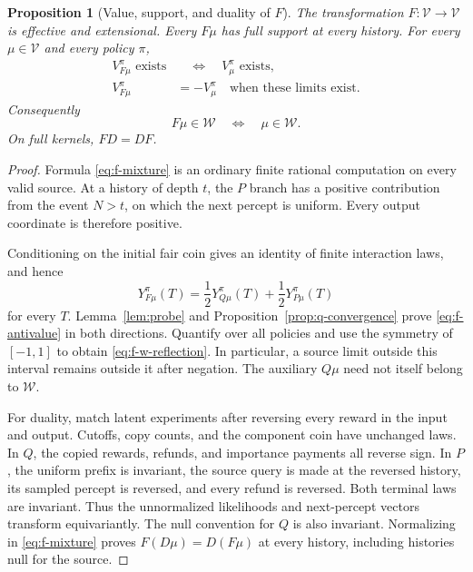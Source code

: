 \documentclass[11pt]{article}
\newtheorem{proposition}[theorem]{Proposition}
\theoremstyle{definition}
\theoremstyle{remark}
\newcommand{\V}{\mathcal V}
\newcommand{\W}{\mathcal W}
\begin{document}
\begin{proposition}[Value, support, and duality of $F$]
\label{prop:f-basic}
The transformation $F:\V\to\V$ is effective and extensional.  Every
$F\mu$ has full support at every history.  For every $\mu\in\V$ and
every policy $\pi$,
\begin{equation}
 \begin{split}
  V_{F\mu}^{\pi}\text{ exists}
      &\quad\Longleftrightarrow\quad V_\mu^\pi\text{ exists},\\
  V_{F\mu}^{\pi}&=-V_\mu^\pi
       \quad\text{when these limits exist}.
 \end{split}
 \label{eq:f-antivalue}
\end{equation}
Consequently
\begin{equation}
  F\mu\in\W\quad\Longleftrightarrow\quad\mu\in\W.
  \label{eq:f-w-reflection}
\end{equation}
On full kernels, $FD=DF$.
\end{proposition}

\begin{proof}
Formula \eqref{eq:f-mixture} is an ordinary finite rational computation
on every valid source.  At a history of depth $t$, the $P$ branch has
a positive contribution from the event $N>t$, on which the next
percept is uniform.  Every output coordinate is therefore positive.

Conditioning on the initial fair coin gives an identity of finite
interaction laws, and hence
\begin{equation}
  Y_{F\mu}^{\pi}(T)=
      \frac12Y_{Q\mu}^{\pi}(T)+\frac12Y_{P\mu}^{\pi}(T)
  \label{eq:f-finite-mixture}
\end{equation}
for every $T$.  Lemma~\ref{lem:probe} and
Proposition~\ref{prop:q-convergence} prove
\eqref{eq:f-antivalue} in both directions.  Quantify over all policies
and use the symmetry of $[-1,1]$ to obtain
\eqref{eq:f-w-reflection}.  In particular, a source limit outside this
interval remains outside it after negation.  The auxiliary $Q\mu$
need not itself belong to $\W$.

For duality, match latent experiments after reversing every reward in
the input and output.  Cutoffs, copy counts, and the component coin
have unchanged laws.  In $Q$, the copied rewards, refunds, and
importance payments all reverse sign.  In $P$, the uniform prefix is
invariant, the source query is made at the reversed history, its
sampled percept is reversed, and every refund is reversed.  Both
terminal laws are invariant.  Thus the unnormalized likelihoods and
next-percept vectors transform equivariantly.  The null convention
for $Q$ is also invariant.  Normalizing in
\eqref{eq:f-mixture} proves $F(D\mu)=D(F\mu)$ at every history,
including histories null for the source.
\end{proof}
\end{document}
